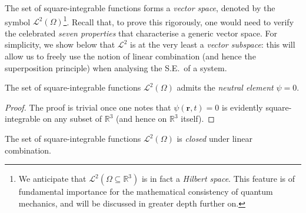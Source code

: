 The set of square-integrable functions forms a \emph{vector space}, denoted by the symbol $\mathcal{L}^2(\Omega)$\footnote{We anticipate that $\mathcal{L}^2(\Omega \subseteq \mathbb{R}^3)$ is in fact a \emph{Hilbert space}. This feature is of fundamental importance for the mathematical consistency of quantum mechanics, and will be discussed in greater depth further on.}. Recall that, to prove this rigorously, one would need to verify the celebrated \emph{seven properties} that characterise a generic vector space. For simplicity, we show below that $\mathcal{L}^2$ is at the very least a \emph{vector subspace}: this will allow us to freely use the notion of linear combination (and hence the superposition principle) when analysing the S.E.\ of a system.
\begin{proprietà}
    The set of square-integrable functions $\mathcal{L}^2(\Omega)$ admits the \emph{neutral element} $\psi = 0$.
\end{proprietà}
\begin{proof}
    The proof is trivial once one notes that $\psi(\bm{r},t) = 0$ is evidently square-integrable on any subset of $\mathbb{R}^3$ (and hence on $\mathbb{R}^3$ itself).
\end{proof}
\begin{proprietà}
    The set of square-integrable functions $\mathcal{L}^2(\Omega)$ is \emph{closed} under linear combination.
\end{proprietà}
